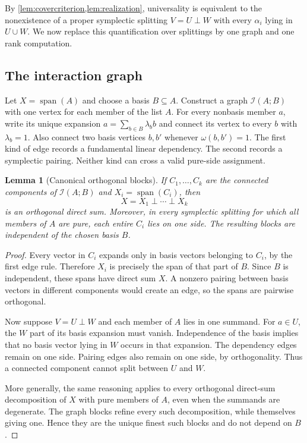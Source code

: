 \documentclass[11pt,letterpaper]{article}
\newtheorem{lemma}[lemma]{Lemma}
\theoremstyle{definition}
\theoremstyle{remark}
\newcommand{\Span}{\operatorname{span}}
\begin{document}
By \cref{lem:covercriterion,lem:realization}, universality is equivalent to the nonexistence of a proper symplectic splitting $V=U\perp W$ with every $\alpha_i$ lying in $U\cup W$. We now replace this quantification over splittings by one graph and one rank computation.

\subsection{The interaction graph}
Let $X=\Span(A)$ and choose a basis $B\subseteq A$. Construct a graph $\mathcal I(A;B)$ with one vertex for each member of the list $A$.
For every nonbasis member $a$, write its unique expansion
$a=\sum_{b\in B}\lambda_b b$ and connect its vertex to every $b$ with $\lambda_b=1$.
Also connect two basis vertices $b,b'$ whenever $\omega(b,b')=1$.
The first kind of edge records a fundamental linear dependency. The second records a symplectic pairing. Neither kind can cross a valid pure-side assignment.

\begin{lemma}[Canonical orthogonal blocks]\label{lem:blocks}
If $C_1,\ldots,C_k$ are the connected components of $\mathcal I(A;B)$ and $X_i=\Span(C_i)$, then
\[
 X=X_1\perp\cdots\perp X_k
\]
is an orthogonal direct sum. Moreover, in every symplectic splitting for which all members of $A$ are pure, each entire $C_i$ lies on one side. The resulting blocks are independent of the chosen basis $B$.
\end{lemma}
\begin{proof}
Every vector in $C_i$ expands only in basis vectors belonging to $C_i$, by the first edge rule. Therefore $X_i$ is precisely the span of that part of $B$. Since $B$ is independent, these spans have direct sum $X$. A nonzero pairing between basis vectors in different components would create an edge, so the spans are pairwise orthogonal.

Now suppose $V=U\perp W$ and each member of $A$ lies in one summand. For $a\in U$, the $W$ part of its basis expansion must vanish. Independence of the basis implies that no basis vector lying in $W$ occurs in that expansion. The dependency edges remain on one side. Pairing edges also remain on one side, by orthogonality. Thus a connected component cannot split between $U$ and $W$.

More generally, the same reasoning applies to every orthogonal direct-sum decomposition of $X$ with pure members of $A$, even when the summands are degenerate. The graph blocks refine every such decomposition, while themselves giving one. Hence they are the unique finest such blocks and do not depend on $B$.
\end{proof}
\end{document}

